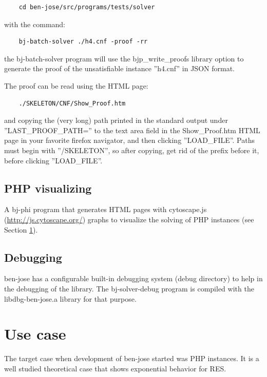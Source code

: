 \documentclass{easychair}
\begin{document}
\begin{verbatim}
	cd ben-jose/src/programs/tests/solver
\end{verbatim}

with the command:

\begin{verbatim}
	bj-batch-solver ./h4.cnf -proof -rr
\end{verbatim}

the bj-batch-solver program will use the bjp\_write\_proofs library option to generate the proof of the unsatisfiable instance ''h4.cnf'' in JSON format. 

The proof can be read using the HTML page:

\begin{verbatim}
	./SKELETON/CNF/Show_Proof.htm
\end{verbatim}

and copying the (very long) path printed in the standard output under ''LAST\_PROOF\_PATH='' to the text area field in the Show\_Proof.htm HTML page in your favorite firefox navigator, and then clicking ''LOAD\_FILE''. Paths must begin with ''/SKELETON'', so after copying, get  rid of the prefix before it, before clicking ''LOAD\_FILE''.

\subsection{PHP visualizing}

A bj-phi program that generates HTML pages with cytoscape.js (\url{http://js.cytoscape.org/}) graphs to visualize the solving of PHP instances (see Section \ref{sect:use-case}).

\subsection{Debugging}

ben-jose has a configurable built-in debugging system (debug directory) to help in the debugging of the library. The bj-solver-debug program is compiled with the libdbg-ben-jose.a library for that purpose.


\section{Use case}
\label{sect:use-case}

The target case when development of ben-jose started was PHP instances. It is a well studied theoretical case that shows exponential behavior for RES.
\end{document}
